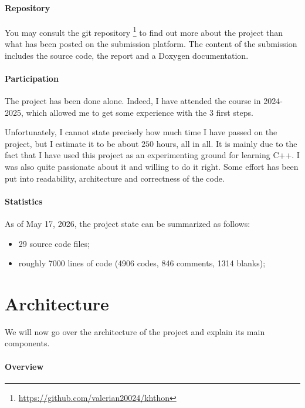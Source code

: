 \documentclass{article}
\begin{document}
\paragraph{Repository}

You may consult the git repository \footnote{\url{https://github.com/valerian20024/khthon}} to find out more about the project than what has been posted on the submission platform. The content of the submission includes the source code, the report and a Doxygen documentation.

\paragraph{Participation}

The project has been done alone. Indeed, I have attended the course in 2024-2025, which allowed me to get some experience with the $3$ first steps.

Unfortunately, I cannot state precisely how much time I have passed on the project, but I estimate it to be about $250$ hours, all in all. It is mainly due to the fact that I have used this project as an experimenting ground for learning C++. I was also quite passionate about it and willing to do it right. Some effort has been put into readability, architecture and correctness of the code.

\paragraph{Statistics}

As of May 17, 2026, the project state can be summarized as follows: 

\begin{itemize}
    \item 29 source code files;
    \item roughly 7000 lines of code (4906 codes, 846 comments, 1314 blanks);
\end{itemize}

\section{Architecture}

We will now go over the architecture of the project and explain its main components.

\paragraph{Overview}
\end{document}
